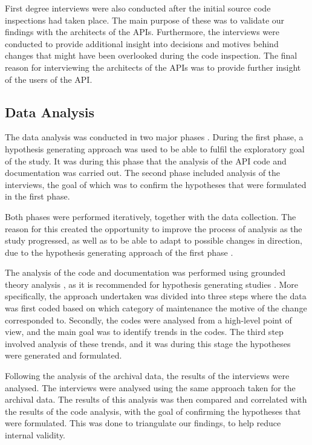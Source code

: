 \documentclass[10pt,twocolumn]{article}
\begin{document}
First degree interviews were also conducted after the initial source code inspections had taken place. The main purpose of these was to validate our findings with the architects of the APIs. Furthermore, the interviews were conducted to provide additional insight into decisions and motives behind changes that might have been overlooked during the code inspection. The final reason for interviewing the architects of the APIs was to provide further insight of the users of the API. 



\subsection{Data Analysis}
The data analysis was conducted in two major phases \cite{andersson2007spiral}. During the first phase, a hypothesis generating approach \cite{seaman1999qualitative} was used to be able to fulfil the exploratory goal of the study. It was during this phase that the analysis of the API code and documentation was carried out. The second phase included analysis of the interviews, the goal of which was to confirm the hypotheses \cite{seaman1999qualitative} that were formulated in the first phase.  

Both phases were performed iteratively, together with the data collection. The reason for this created the opportunity to improve the process of analysis as the study progressed, as well as to be able to adapt to possible changes in direction, due to the hypothesis generating approach of the first phase \cite{andersson2007spiral}. 

The analysis of the code and documentation was performed using grounded theory analysis \cite{seaman1999qualitative}, as it is recommended for hypothesis generating studies \cite{runeson2009guidelines} \cite{seaman1999qualitative}. More specifically, the approach undertaken was divided into three steps where the data was first coded based on which category of maintenance \cite{iso} the motive of the change corresponded to. Secondly, the codes were analysed from a high-level point of view, and the main goal was to identify trends in the codes. The third step involved analysis of these trends, and it was during this stage the hypotheses were generated and formulated. 

Following the analysis of the archival data, the results of the interviews were analysed. The interviews were analysed using the same approach taken for the archival data. The results of this analysis was then compared and correlated with the results of the code analysis, with the goal of confirming the hypotheses that were formulated. This was done to triangulate our findings, to help reduce internal validity. 
\end{document}
